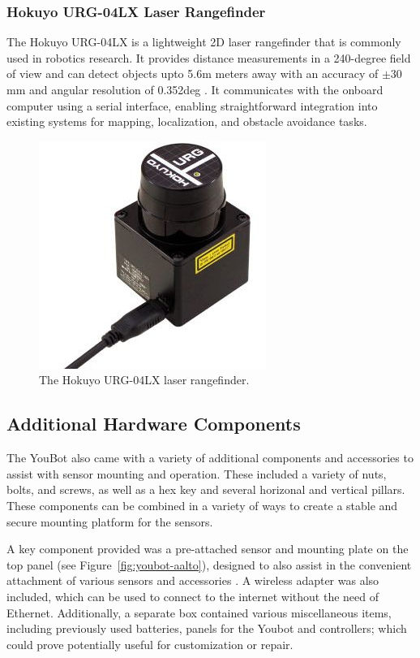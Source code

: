 \documentclass[a4paper, 12pt]{article}
\begin{document}
    \subsubsection{Hokuyo URG-04LX Laser Rangefinder}

    The Hokuyo URG-04LX is a lightweight 2D laser rangefinder that is commonly used in robotics research. It provides distance measurements in a 240-degree field of view and can detect objects upto 5.6m meters away with an accuracy of \(\pm30\) mm and angular resolution of 0.352deg \cite{HokuyoURG04LXUG01}. It communicates with the onboard computer using a serial interface, enabling straightforward integration into existing systems for mapping, localization, and obstacle avoidance tasks. 

    \begin{figure}[ht]
        \centering
        \includegraphics[width=0.25\linewidth]{images/sec2/hokuyo.png}
        \caption{The Hokuyo URG-04LX laser rangefinder.}
    \end{figure}

    \subsection{Additional Hardware Components}

    The YouBot also came with a variety of additional components and accessories to assist with sensor mounting and operation. These included a variety of nuts, bolts, and screws, as well as a hex key and several horizonal and vertical pillars. These components can be combined in a variety of ways to create a stable and secure mounting platform for the sensors. 

    A key component provided was a pre-attached sensor and mounting plate on the top panel (see Figure~\ref{fig:youbot-aalto}), designed to also assist in the convenient attachment of various sensors and accessories \cite{YouBotSensorPlate2016}. A wireless adapter was also included, which can be used to connect to the internet without the need of Ethernet. Additionally, a separate box contained various miscellaneous items, including previously used batteries, panels for the Youbot and controllers; which could prove potentially useful for customization or repair. 
\end{document}
